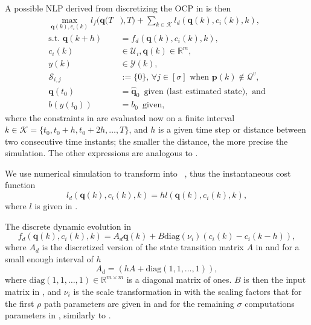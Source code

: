 A possible NLP derived from discretizing the OCP in  is then
\begin{subequations}\label{eq:disc-ocp-output-mpc}\begin{align}
  \max_{\mathbf{q}(k),c_i(k)}{l_f(\mathbf{q}(T}&{),T)+\sum_{k\in\mathcal{K}}{l_d(\mathbf{q}(k),c_i(k),k)}},\\
  \text{s.t. }\mathbf{q}(k+h)&=f_d(\mathbf{q}(k),c_i(k),k),\label{eq:disc-dyn-evol}\\
  c_i(k)&\in\mathcal{U}_i,\mathbf{q}(k)\in\mathbb{R}^m,\label{eq:disc-state-cont-const-mpc}\\
  y(k)&\in\mathcal{Y}(k),\label{eq:disc-batt-const-mpc}\\
  \mathcal{S}_{i,j}&:=\{0\},\,\forall j \in [\sigma]\text{ when }\mathbf{p}(k)\notin\mathcal{Q}^v,\label{eq:disc-polyg-const}\\
  \mathbf{q}(t_0)&=\hat{\mathbf{q}}_0\,\,\,\text{given (last estimated state)},\text{ and}\\
  b(y(t_0))&=b_0\,\,\,\text{given},
\end{align}\end{subequations}
where the constraints in  are evaluated now on a finite interval $k\in\mathcal{K}=\{t_0,t_0+h,t_0+2h,\dots,T\}$, and $h$ is a given time step or distance between two  consecutive time instants; the smaller the distance, the more precise the simulation. The other expressions are analogous to .

We use numerical simulation to transform  into ~\citep{iserles2009first}, thus 
the instantaneous cost function
\begin{equation}\label{eq:mpc-cost-euler}
  l_d(\mathbf{q}(k),c_i(k),k)=hl(\mathbf{q}(k),c_i(k),k),
\end{equation}
where $l$ is given in .

The discrete dynamic evolution in 
\begin{equation}\label{eq:nlp-discr-dyn}
  f_d(\mathbf{q}(k),c_i(k),k)=A_d\mathbf{q}(k)+B\mathrm{diag}(\nu_i)(c_i(k)-c_i(k-h)),
\end{equation}
where $A_d$ is the discretized version of the state transition matrix $A$ in  and for a small enough interval of $h$
\begin{equation}
A_d=(hA+\mathrm{diag}(1,1,\dots,1)),
\end{equation}
where $\mathrm{diag}(1,1,\dots,1)\in\mathbb{R}^{m\times m}$ is a diagonal matrix of ones. $B$ is then the input matrix in , and $\nu_i$ is the scale transformation in  with the scaling factors that for the first $\rho$ path parameters are given in  and for the remaining $\sigma$ computations parameters in , similarly to .


